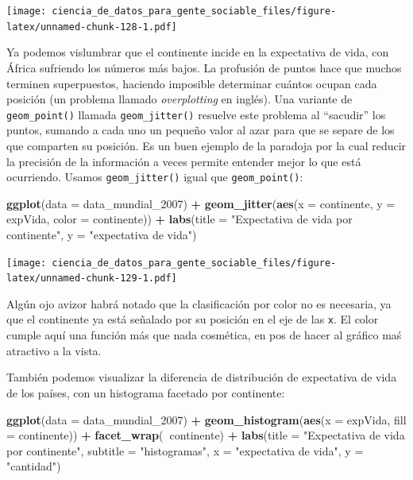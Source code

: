 \documentclass[spanish,]{book}
\newenvironment{Shaded}{\begin{snugshade}}{\end{snugshade}}
\newcommand{\DataTypeTok}[1]{\textcolor[rgb]{0.13,0.29,0.53}{#1}}
\newcommand{\DecValTok}[1]{\textcolor[rgb]{0.00,0.00,0.81}{#1}}
\newcommand{\KeywordTok}[1]{\textcolor[rgb]{0.13,0.29,0.53}{\textbf{#1}}}
\newcommand{\NormalTok}[1]{#1}
\newcommand{\OperatorTok}[1]{\textcolor[rgb]{0.81,0.36,0.00}{\textbf{#1}}}
\newcommand{\StringTok}[1]{\textcolor[rgb]{0.31,0.60,0.02}{#1}}
\begin{document}
\texttt{[image: ciencia\_de\_datos\_para\_gente\_sociable\_files/figure-latex/unnamed-chunk-128-1.pdf]}

Ya podemos vislumbrar que el continente incide en la expectativa de vida, con África sufriendo los números más bajos. La profusión de puntos hace que muchos terminen superpuestos, haciendo imposible determinar cuántos ocupan cada posición (un problema llamado \emph{overplotting} en inglés). Una variante de \texttt{geom\_point()} llamada \texttt{geom\_jitter()} resuelve este problema al ``sacudir'' los puntos, sumando a cada uno un pequeño valor al azar para que se separe de los que comparten su posición. Es un buen ejemplo de la paradoja por la cual reducir la precisión de la información a veces permite entender mejor lo que está ocurriendo. Usamos \texttt{geom\_jitter()} igual que \texttt{geom\_point()}:

\begin{Shaded}
\begin{Highlighting}[]
\KeywordTok{ggplot}\NormalTok{(}\DataTypeTok{data =}\NormalTok{ data_mundial_}\DecValTok{2007}\NormalTok{) }\OperatorTok{+}
\StringTok{    }\KeywordTok{geom_jitter}\NormalTok{(}\KeywordTok{aes}\NormalTok{(}\DataTypeTok{x =}\NormalTok{ continente, }\DataTypeTok{y =}\NormalTok{ expVida, }\DataTypeTok{color =}\NormalTok{ continente)) }\OperatorTok{+}
\StringTok{    }\KeywordTok{labs}\NormalTok{(}\DataTypeTok{title =} \StringTok{"Expectativa de vida por continente"}\NormalTok{,}
         \DataTypeTok{y =} \StringTok{"expectativa de vida"}\NormalTok{)}
\end{Highlighting}
\end{Shaded}

\texttt{[image: ciencia\_de\_datos\_para\_gente\_sociable\_files/figure-latex/unnamed-chunk-129-1.pdf]}

Algún ojo avizor habrá notado que la clasificación por color no es necesaria, ya que el continente ya está señalado por su posición en el eje de las \texttt{x}. El color cumple aquí una función más que nada cosmética, en pos de hacer al gráfico maś atractivo a la vista.

También podemos visualizar la diferencia de distribución de expectativa de vida de los países, con un histograma facetado por continente:

\begin{Shaded}
\begin{Highlighting}[]
\KeywordTok{ggplot}\NormalTok{(}\DataTypeTok{data =}\NormalTok{ data_mundial_}\DecValTok{2007}\NormalTok{) }\OperatorTok{+}
\StringTok{    }\KeywordTok{geom_histogram}\NormalTok{(}\KeywordTok{aes}\NormalTok{(}\DataTypeTok{x =}\NormalTok{ expVida, }\DataTypeTok{fill =}\NormalTok{ continente)) }\OperatorTok{+}
\StringTok{    }\KeywordTok{facet_wrap}\NormalTok{(}\OperatorTok{~}\NormalTok{continente) }\OperatorTok{+}
\StringTok{    }\KeywordTok{labs}\NormalTok{(}\DataTypeTok{title =} \StringTok{"Expectativa de vida por continente"}\NormalTok{,}
         \DataTypeTok{subtitle =} \StringTok{"histogramas"}\NormalTok{,}
        \DataTypeTok{x =} \StringTok{"expectativa de vida"}\NormalTok{,}
        \DataTypeTok{y =} \StringTok{"cantidad"}\NormalTok{)}
\end{Highlighting}
\end{Shaded}
\end{document}
